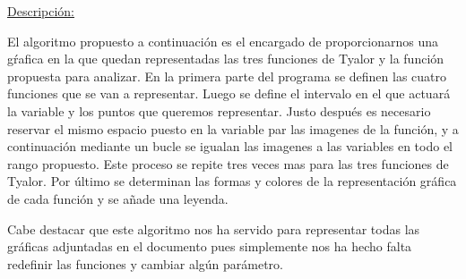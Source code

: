 \documentclass[a4paper,12pt]{article}
\begin{document}
\underline{Descripción:}

El algoritmo propuesto a continuación es el encargado de proporcionarnos una gŕafica en la que quedan representadas las tres funciones de Tyalor y la función propuesta
para analizar. En la primera parte del programa se definen las cuatro funciones que se van a representar. Luego se define el intervalo en el que actuará la variable y 
los puntos que queremos representar. Justo después es necesario reservar el mismo espacio puesto en la variable par las imagenes de la función, y a continuación mediante un
bucle se igualan las imagenes a las variables en todo el rango propuesto. Este proceso se repite tres veces mas para las tres funciones de Tyalor. Por último se determinan
las formas y colores de la representación gráfica de cada función y se añade una leyenda. 

Cabe destacar que este algoritmo nos ha servido para representar todas las gráficas adjuntadas en el documento pues simplemente nos ha hecho falta redefinir las funciones
y cambiar algún parámetro. 
\end{document}
